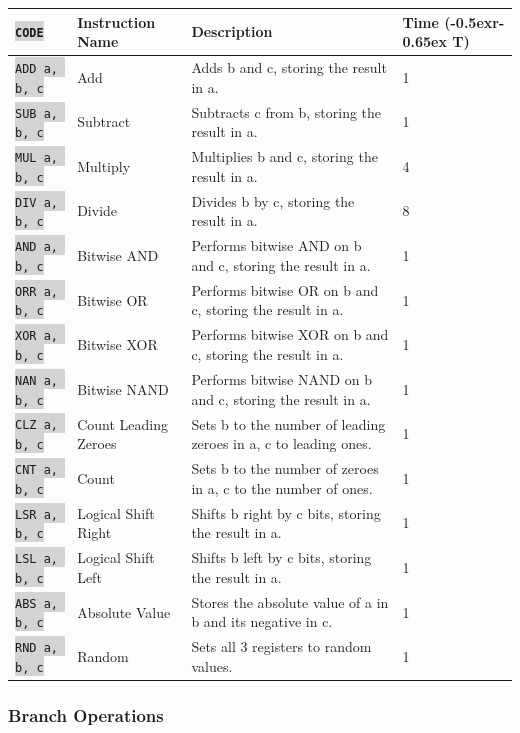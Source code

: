 \documentclass{article}
\newcommand{\vnscode}[1]{\colorbox{lightgray}{\lstinline[language=vns]{#1}}}
\newcommand{\RT}{\lower-0.5ex\hbox{r}\kern-0.65ex T}
\begin{document}
\begin{minipage}{\textwidth}
\label{table:arithmetic}
\centering
\begin{tabular}{llll}
    \hline \vnscode{CODE} & Instruction Name & Description & Time (\RT) \\ \hline
    \vnscode{ADD a, b, c} & Add & Adds b and c, storing the result in a. & 1 \\
    \vnscode{SUB a, b, c} & Subtract & Subtracts c from b, storing the result in a. & 1 \\
    \vnscode{MUL a, b, c} & Multiply & Multiplies b and c, storing the result in a. & 4 \\
    \vnscode{DIV a, b, c} & Divide & Divides b by c, storing the result in a. & 8 \\
    \vnscode{AND a, b, c} & Bitwise AND & Performs bitwise AND on b and c, storing the result in a. & 1 \\
    \vnscode{ORR a, b, c} & Bitwise OR & Performs bitwise OR on b and c, storing the result in a. & 1 \\
    \vnscode{XOR a, b, c} & Bitwise XOR & Performs bitwise XOR on b and c, storing the result in a. & 1 \\
    \vnscode{NAN a, b, c} & Bitwise NAND & Performs bitwise NAND on b and c, storing the result in a. & 1 \\
    \vnscode{CLZ a, b, c} & Count Leading Zeroes & Sets b to the number of leading zeroes in a, c to leading ones. & 1 \\
    \vnscode{CNT a, b, c} & Count & Sets b to the number of zeroes in a, c to the number of ones. & 1 \\
    \vnscode{LSR a, b, c} & Logical Shift Right & Shifts b right by c bits, storing the result in a. & 1 \\
    \vnscode{LSL a, b, c} & Logical Shift Left & Shifts b left by c bits, storing the result in a. & 1 \\
    \vnscode{ABS a, b, c} & Absolute Value & Stores the absolute value of a in b and its negative in c. & 1 \\
    \vnscode{RND a, b, c} & Random & Sets all 3 registers to random values. & 1 \\
\end{tabular}
\end{minipage}

\subsubsection{Branch Operations}
\end{document}
